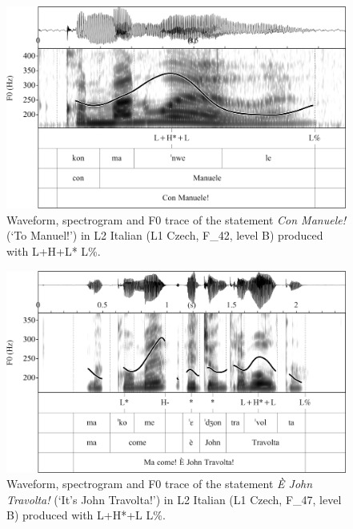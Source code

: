 \begin{figure}
\includegraphics[width=\textwidth]{figures/Figure_4.48.png}
\caption{Waveform, spectrogram and F0 trace of the statement \textit{Con Manuele!} (‘To Manuel!’) in L2 Italian (L1 Czech, F\_42, level B) produced with L+H+L* L\%.}
\label{fig:4.48}
\end{figure}

\begin{figure}
\includegraphics[width=\textwidth]{figures/Figure_4.49.png}
\caption{Waveform, spectrogram and F0 trace of the statement \textit{È John Travolta!} (‘It’s John Travolta!’) in L2 Italian (L1 Czech, F\_47, level B) produced with L+H*+L L\%.}
\label{fig:4.49}
\end{figure}


